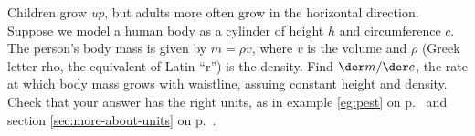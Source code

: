 Children grow \emph{up}, but adults more often grow in the
horizontal direction. Suppose we model a human body as
a cylinder of height $h$ and circumference $c$. The person's
body mass is given by $m=\rho v$, where $v$ is the
volume and $\rho$ (Greek
letter rho, the equivalent of Latin ``r'') is the density.
Find $\der m/\der c$, the rate at which body mass
grows with waistline, assuing constant height and density.
Check that your answer has the right units, as in example
\ref{eg:pest} on p.~\pageref{eg:pest} and section \ref{sec:more-about-units} on p.~\pageref{sec:more-about-units}.\answercheck
